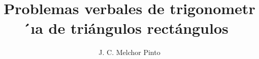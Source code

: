 \documentclass[12pt]{guia}
\title{Problemas verbales de trigonometr ́ıa de triángulos rectángulos}
\author{J. C. Melchor Pinto}
\begin{document}
\pagestyle{headandfoot}
\addpoints
\INFO
\printanswers

\newpage
\begin{questions}
    
    \newpage
    
    
    
    
    
    
\end{questions}
\end{document}
